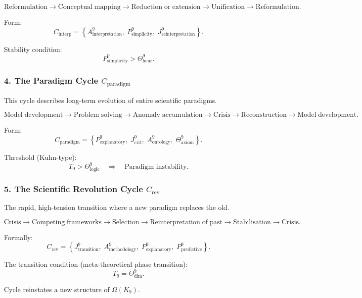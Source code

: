 \[
  \mathrm{Reformulation}
  \to
  \mathrm{Conceptual\;mapping}
  \to
  \mathrm{Reduction\;or\;extension}
  \to
  \mathrm{Unification}
  \to
  \mathrm{Reformulation}.
\]

Form:
\[
 C_{\mathrm{interp}}
  =
  \left\{
    A^9_{\mathrm{interpretation}},\;
    P^9_{\mathrm{simplicity}},\;
    J^9_{\mathrm{reinterpretation}}
  \right\}.
\]

Stability condition:
\[
  P^9_{\mathrm{simplicity}} >
  \Theta^9_{\mathrm{heur}}.
\]


\subsubsection{4. The Paradigm Cycle $C_{\mathrm{paradigm}}$}

This cycle describes long-term evolution of entire scientific paradigms.

\[
  \mathrm{Model\;development}
  \to
  \mathrm{Problem\;solving}
  \to
  \mathrm{Anomaly\;accumulation}
  \to
  \mathrm{Crisis}
  \to
  \mathrm{Reconstruction}
  \to
  \mathrm{Model\;development}.
\]

Form:
\[
 C_{\mathrm{paradigm}}
  =
  \left\{
    P^9_{\mathrm{explanatory}},\;
    J^9_{\mathrm{crit}},\;
    A^9_{\mathrm{ontology}},\;
    \Theta^9_{\mathrm{axiom}}
  \right\}.
\]

Threshold (Kuhn-type):
\[
  T_9 > \Theta^9_\mathrm{logic}
  \quad\Rightarrow\quad
  \text{Paradigm instability}.
\]


\subsubsection{5. The Scientific Revolution Cycle $C_{\mathrm{rev}}$}

The rapid, high-tension transition where a new paradigm replaces the old.

\[
  \mathrm{Crisis}
  \to
  \mathrm{Competing\;frameworks}
  \to
  \mathrm{Selection}
  \to
  \mathrm{Reinterpretation\;of\;past}
  \to
  \mathrm{Stabilisation}
  \to
  \mathrm{Crisis}.
\]

Formally:
\[
 C_{\mathrm{rev}}
   =
   \left\{
     J^9_{\mathrm{transition}},\;
     A^9_{\mathrm{methodology}},\;
     P^9_{\mathrm{explanatory}},\;
     P^9_{\mathrm{predictive}}
   \right\}.
\]

The transition condition (meta-theoretical phase transition):
\[
  T_9 = \Theta^9_{\mathrm{dim}}.
\]

Cycle reinstates a new structure of $\Omega(K_9)$.


